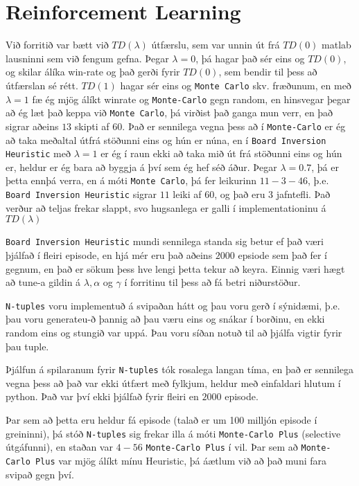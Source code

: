 \documentclass[12pt]{article}
\begin{document}
\section{Reinforcement Learning}

Við forritið var bætt við $TD(\lambda)$ útfærslu,
sem var unnin út frá $TD(0)$ matlab lausninni sem við fengum gefna.
Þegar $\lambda = 0$, þá hagar það sér eins og $TD(0)$, og skilar álíka win-rate og það gerði
fyrir $TD(0)$, sem bendir til þess að útfærslan sé rétt.
$TD(1)$ hagar sér eins og \verb|Monte Carlo| skv. fræðunum, en með $\lambda = 1$
fæ ég mjög álíkt winrate og \verb|Monte-Carlo| gegn random, en hinsvegar þegar að ég
læt það keppa við \verb|Monte Carlo|, þá virðist það ganga mun verr, en það sigrar
aðeins $13$ skipti af $60$. Það er sennilega vegna þess að í \verb|Monte-Carlo|
er ég að taka meðaltal útfrá stöðunni eins og hún er núna, en í \verb|Board Inversion Heuristic|
með $\lambda = 1$ er ég í raun ekki að taka mið út frá stöðunni eins og hún er, heldur
er ég  bara að byggja á því sem ég hef séð áður. Þegar $\lambda = 0.7$,
þá er þetta ennþá verra, en á móti \verb|Monte Carlo|, þá fer leikurinn
$11-3-46$, þ.e. \verb|Board Inversion Heuristic| sigrar $11$ leiki af $60$,
og það eru $3$ jafntefli. Það verður að teljas frekar slappt,
svo hugsanlega er galli í implementationinu á $TD(\lambda)$

\verb|Board Inversion Heuristic| mundi sennilega standa sig betur ef það væri þjálfað
í fleiri episode, en hjá mér eru það aðeins $2000$ epsiode sem það fer í gegnum,
en það er sökum þess hve lengi þetta tekur að keyra. Einnig væri hægt að tune-a
gildin á $\lambda, \alpha$ og $\gamma$ í forritinu til þess að fá betri niðurstöður.

\verb|N-tuples| voru implementuð á svipaðan hátt og þau voru gerð í sýnidæmi,
þ.e. þau voru generateu-ð þannig að þau væru eins og snákar í borðinu, en ekki
random eins og stungið var uppá. Þau voru síðan notuð til að þjálfa vigtir fyrir
þau tuple.

Þjálfun á spilaranum fyrir \verb|N-tuples| tók rosalega langan tíma,
en það er sennilega vegna þess að það var ekki útfært með fylkjum, heldur
með einfaldari hlutum í python. Það var því ekki þjálfað fyrir fleiri en $2000$ episode.

Þar sem að þetta eru heldur fá episode (talað er um 100 milljón episode 
í greininni), þá stóð \verb|N-tuples| sig frekar illa á móti \verb|Monte-Carlo Plus|
(selective útgáfunni), en staðan var $4-56$ \verb|Monte-Carlo Plus| í vil.
Þar sem að \verb|Monte-Carlo Plus| var mjög álíkt mínu Heuristic,
þá áætlum við að það muni fara svipað gegn því.
\end{document}

